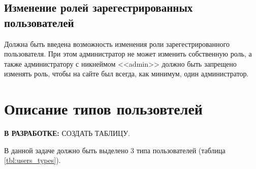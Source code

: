 \subsection{Изменение ролей зарегестрированных пользователей}

Должна быть введена возможность изменения роли зарегестрированного пользователя. При этом администратор не может изменить собственную роль, а также администратору с никнеймом <<admin>> должно быть запрещено изменять роль, чтобы на сайте был всегда, как минимум, один администратор.


\section{Описание типов пользовтелей}

\textbf{В РАЗРАБОТКЕ:} СОЗДАТЬ ТАБЛИЦУ.

В данной задаче должно быть выделено 3 типа пользователей (таблица \ref{tbl:users_types}). 



